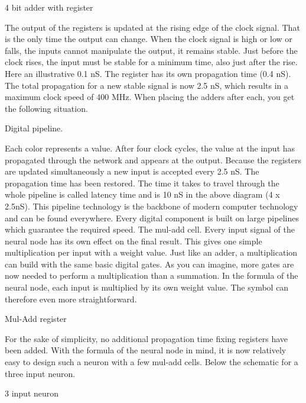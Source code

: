 4 bit adder with register

The output of the registers is updated at the rising edge of the clock signal. That is the only time the output can change. When the clock signal is high or low or falls, the inputs cannot manipulate the output, it remains stable. Just before the clock rises, the input must be stable for a minimum time, also just after the rise. Here an illustrative 0.1 nS. The register has its own propagation time (0.4 nS). The total propagation for a new stable signal is now 2.5 nS, which results in a maximum clock speed of 400 MHz. When placing the adders after each, you get the following situation.

Digital pipeline.

  
Each color represents a value. After four clock cycles, the value at the input has propagated through the network and appears at the output. Because the registers are updated simultaneously a new input is accepted every 2.5 nS.  The propagation time has been restored. The time it takes to travel through the whole pipeline is called latency time and is 10 nS in the above diagram (4 x 2.5nS). This pipeline technology is the backbone of modern computer technology and can be found everywhere. Every digital component is built on large pipelines which guarantee the required speed.  
The mul-add cell.
Every input signal of the neural node has its own effect on the final result. This gives one simple multiplication per input with a weight value. Just like an adder, a multiplication can build with the same basic digital gates. As you can imagine, more gates are now needed to perform a multiplication than a summation. In the formula of the neural node, each input is multiplied by its own weight value. The symbol can therefore even more straightforward.

Mul-Add register

  
For the sake of simplicity, no additional propagation time fixing registers have been added.
With the formula of the neural node in mind, it is now relatively easy to design such a neuron with a few mul-add cells. Below the schematic for a three input neuron.

3 input neuron

